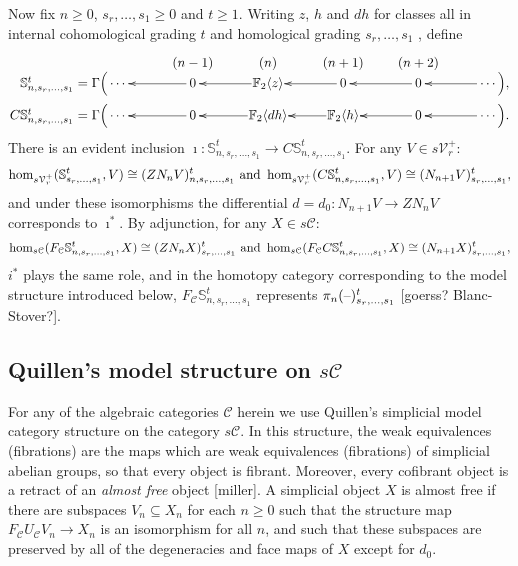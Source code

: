 \documentclass[11pt]{amsart}
\theoremstyle{plain}
\theoremstyle{definition}
\newcommand{\DASH}{\textup{--}}
\renewcommand{\to}{\longrightarrow}
\newcommand{\calC}{\mathcal{C}}
\newcommand{\calV}{\mathcal{V}}
\theoremstyle{plain}
\newcommand{\vect}[2]{\calV^{#1}_{#2}}
\newcommand{\F}{\mathbb{F}}
\begin{document}
\begin{Conventions and notation}
Now fix $n\geq0$, $s_r,\ldots,s_1\geq0$ and $t\geq1$. Writing $z$, $h$ and $dh$ for classes all in internal cohomological grading $t$ and homological grading $s_r,\ldots,s_1$ , define
\begin{gather*}
\phantom{C\mathbb{S}_{n,s_r,\ldots,s_1}^t=\Gamma\Bigl(}\xymatrix@R=1.5mm@1@!C{
&{\smash{(n-1)}}&{\smash{(n)}}&{\smash{(n+1)}}&{\smash{(n+2)}}\\
{\makebox[0cm][r]{$\,\mathbb{S}_{n,s_r,\ldots,s_1}^t=\Gamma\Bigl($}\cdots\,} &%
{\,0\,}\ar[l]
&%
\F_2\langle z\rangle\ar[l]
&%
{\,0\,}\ar[l]
&{\,0\,}\ar[l]
&{\,\cdots\Bigr),} \ar[l]
\\
{\makebox[0cm][r]{$\,C\mathbb{S}_{n,s_r,\ldots,s_1}^t=\Gamma\Bigl($}\cdots\,} &%
{\,0\,}\ar[l]
&%
\F_2\langle dh\rangle\ar[l]
&%
\F_2\langle h\rangle\ar[l]
&{\,0\,}\ar[l]
&{\,\cdots\Bigr).} \ar[l]
}
\end{gather*}
There is an evident inclusion $\imath:\mathbb{S}_{n,s_r,\ldots,s_1}^t\to C\mathbb{S}_{n,s_r,\ldots,s_1}^t$. For any $V\in s\vect{+}{r}$:
\[\hom_{s\vect{+}{r}}(\mathbb{S}^t_{s_r,\ldots,s_1},V)\cong (ZN_nV)_{n,s_r,\ldots,s_1}^t\textup{ and }\hom_{s\vect{+}{r}}(C\mathbb{S}^t_{n,s_r,\ldots,s_1},V)\cong (N_{n+1}V)_{s_r,\ldots,s_1}^t,\]
and under these isomorphisms the differential $d=d_0:N_{n+1}V\to ZN_nV$ corresponds to $\imath^*$.
By adjunction, for any $X\in s\calC$:
\[\hom_{s\calC}(F_\calC\mathbb{S}^t_{n,s_r,\ldots,s_1},X)\cong (ZN_nX)_{s_r,\ldots,s_1}^t\textup{ and }\hom_{s\calC}(F_{\calC}C\mathbb{S}^t_{n,s_r,\ldots,s_1},X)\cong (N_{n+1}X)_{s_r,\ldots,s_1}^t,\]
$i^*$ plays the same role, and in the homotopy category corresponding to the model structure introduced below, $F_\calC\mathbb{S}^t_{n,s_r,\ldots,s_1}$ represents $\pi_n(\DASH)^t_{s_r,\ldots,s_1}$ [goerss? Blanc-Stover?].
\subsection{Quillen's model structure on $s\calC$}
For any of the algebraic categories $\calC$ herein we use Quillen's simplicial model category structure on the category $s\calC$. In this structure, the weak equivalences (fibrations) are the maps which are weak equivalences (fibrations) of simplicial abelian groups, so that every object is fibrant. Moreover, every cofibrant object is a retract of an \emph{almost free} object [miller]. A simplicial object $X$ is almost free if there are subspaces $V_n\subseteq X_n$ for each $n\geq0$ such that the structure map $F_{\calC}U_\calC V_n\to X_n$ is an isomorphism for all $n$, and such that these subspaces are preserved by all of the degeneracies and face maps of $X$ except for $d_0$.


\end{Conventions and notation}
\end{document}
